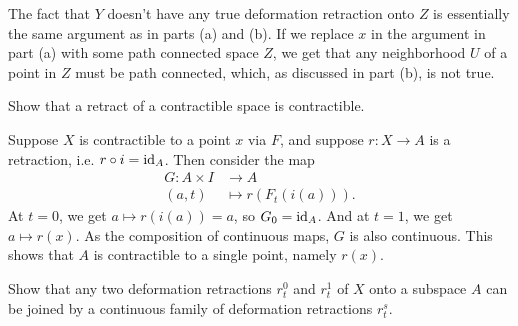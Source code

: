 \documentclass[twoside,10pt]{article}
\begin{document}
\begin{enumerate}
		The fact that $Y$ doesn't have any true deformation retraction onto $Z$ is essentially the same argument as in parts (a) and (b). If we replace $x$ in the argument in part (a) with some path connected space $Z$, we get that any neighborhood $U$ of a point in $Z$ must be path connected, which, as discussed in part (b), is not true.
\end{enumerate}

\newpage

\begin{exer}[0: 9]
Show that a retract of a contractible space is contractible.
\end{exer}

Suppose $X$ is contractible to a point $x$ via $F$, and suppose $r:X\to A$ is a retraction, i.e. $r \circ i = \operatorname{id}_{A}$. Then consider the map
\begin{align*}
	G: A \times I &\to A \\
	(a,t) &\mapsto r(F_{t}(i(a))).
\end{align*}
At $t=0$, we get $a \mapsto r(i(a)) = a$, so $G_0=\operatorname{id}_{A}$. And at $t=1$, we get $a \mapsto r(x)$. As the composition of continuous maps, $G$ is also continuous. This shows that $A$ is contractible to a single point, namely $r(x)$.

\newpage

\begin{exer}[0: 13]
	Show that any two deformation retractions $r_{t}^{0}$ and $r_{t}^{1}$ of $X$ onto a subspace $A$ can be joined by a continuous family of deformation retractions $r_{t}^{s}$.
\end{exer}
\end{document}
